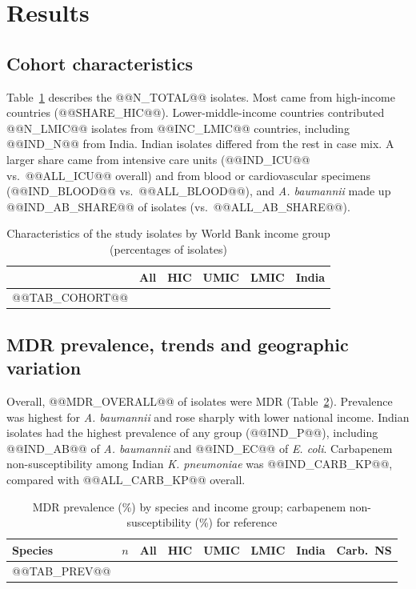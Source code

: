 \documentclass[11pt,a4paper]{article}
\newcommand{\sci}[1]{\textit{#1}}
\begin{document}
\section{Results}\label{sec:results}
\subsection{Cohort characteristics}
Table~\ref{tab:cohort} describes the @@N_TOTAL@@ isolates. Most came from high-income countries (@@SHARE_HIC@@). Lower-middle-income countries contributed @@N_LMIC@@ isolates from @@INC_LMIC@@ countries, including @@IND_N@@ from India. Indian isolates differed from the rest in case mix. A larger share came from intensive care units (@@IND_ICU@@ vs.\ @@ALL_ICU@@ overall) and from blood or cardiovascular specimens (@@IND_BLOOD@@ vs.\ @@ALL_BLOOD@@), and \sci{A. baumannii} made up @@IND_AB_SHARE@@ of isolates (vs.\ @@ALL_AB_SHARE@@).

\begin{table}[t]
\caption{Characteristics of the study isolates by World Bank income group (percentages of isolates)}\label{tab:cohort}
\centering\footnotesize
\begin{tabular}{lrrrrr}
\toprule
 & All & HIC & UMIC & LMIC & India \\
\midrule
@@TAB_COHORT@@
\bottomrule
\end{tabular}
\end{table}

\subsection{MDR prevalence, trends and geographic variation}
Overall, @@MDR_OVERALL@@ of isolates were MDR (Table~\ref{tab:prev}). Prevalence was highest for \sci{A. baumannii} and rose sharply with lower national income. Indian isolates had the highest prevalence of any group (@@IND_P@@), including @@IND_AB@@ of \sci{A. baumannii} and @@IND_EC@@ of \sci{E. coli}. Carbapenem non-susceptibility among Indian \sci{K. pneumoniae} was @@IND_CARB_KP@@, compared with @@ALL_CARB_KP@@ overall.

\begin{table}[t]
\caption{MDR prevalence (\%) by species and income group; carbapenem non-susceptibility (\%) for reference}\label{tab:prev}
\centering\footnotesize
\begin{tabular}{lrrrrrrr}
\toprule
Species & $n$ & All & HIC & UMIC & LMIC & India & Carb.\ NS \\
\midrule
@@TAB_PREV@@
\bottomrule
\end{tabular}
\end{table}
\end{document}
